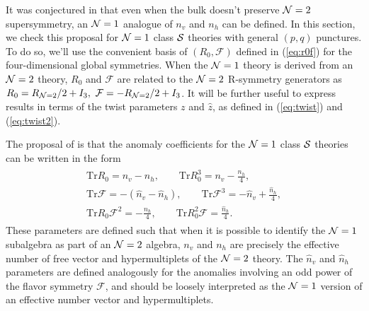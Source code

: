 \documentclass[a4paper,11pt]{article}
\newcommand{\ba}[1]{\begin{align} #1 \end{align} }
\newcommand{\bs}[1]{\begin{split} #1 \end{split} }
\def\tr{\text{Tr}}
\def\CN{{\cal N}}
\def\CS{{\cal S}}
\newcommand{\mc}[1]{\mathcal{ #1} }
\begin{document}
It was conjectured in \cite{Agarwal:2014rua} that even when the bulk doesn't preserve $\CN=2$ supersymmetry, an $\CN=1$ analogue of $n_v$ and $n_h$ can be defined. In this section, we check this proposal for $\CN=1$ class $\CS$ theories with general $(p,q)$ punctures. To do so, we'll use the convenient basis of $(R_0,\mc{F})$ defined in (\ref{eq:r0f}) for the four-dimensional global symmetries. When the $\CN=1$ theory is derived from an $\CN=2$ theory, $R_0$ and $\mc{F}$ are related to the $\CN=2$ R-symmetry generators as $R_0=R_{\CN=2}/2+I_3,\ \mc{F}=-R_{\CN=2}/2+I_3$. It will be further useful to express results in terms of the twist parameters $z$ and $\hat{z}$, as defined in (\ref{eq:twist}) and (\ref{eq:twist2}).

The proposal of \cite{Agarwal:2014rua} is that the anomaly coefficients for the $\CN=1$ class $\CS$ theories can be written in the form
\ba{\bs{
\tr R_0=n_v-n_h,\qquad \tr R_0^3=n_v-\frac{n_h}{4},\\
\tr \mc{F}=-(\hat{n}_v-\hat{n}_h),\qquad \tr \mc{F}^3=-\hat{n}_v+\frac{\hat{n}_h}{4},\\
\tr R_0 \mc{F}^2 = -\frac{n_h}{4},\qquad \tr R_0^2 \mc{F}=\frac{\hat{n}_h}{4}.
}\label{eq:conjecture}}
These parameters are defined such that when it is possible to identify the $\CN=1$ subalgebra as part of an $\CN=2$ algebra, $n_v$ and $n_h$ are precisely the effective number of free vector and hypermultiplets of the $\CN=2$ theory. The $\hat{n}_v$ and $\hat{n}_h$ parameters are defined analogously for the anomalies involving an odd power of the flavor symmetry $\mc{F}$, and should be loosely interpreted as the $\CN=1$ version of an effective number vector and hypermultiplets.
\end{document}
